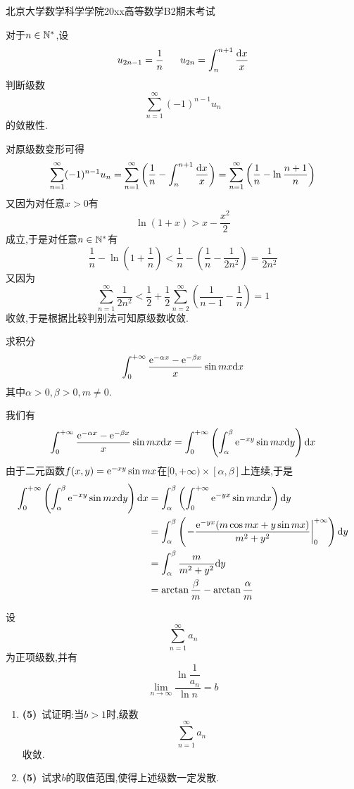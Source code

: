 \documentclass{ctexart}
\begin{document}
\pagestyle{empty}
\begin{center}\Large
    北京大学数学科学学院20xx高等数学B2期末考试
\end{center}
\begin{problem}[1.(10\songti{分})]
    对于$n\in\mathbb{N}^*$,设
    \[u_{2n-1}=\dfrac1n\ \ \ \ \ u_{2n}=\int_n^{n+1}\dfrac{\di x}{x}\]
    判断级数
    \[\sum_{n=1}^{\infty}(-1)^{n-1}u_n\]
    的敛散性.

\end{problem}
\begin{solution}
    对原级数变形可得
    \[\sum_{n=1}^{\infty}(-1)^{n-1}u_n
    =\sum_{n=1}^{\infty}\left(\dfrac1n-\int_n^{n+1}\dfrac{\mathrm{d} x}{x}\right)
    =\sum_{n=1}^{\infty}\left(\dfrac{1}{n}-\ln\dfrac{n+1}{n}\right)\]
    又因为对任意$x>0$有
    \[\ln(1+x)>x-\dfrac{x^2}{2}\]
    成立,于是对任意$n\in\mathbb{N}^*$有
    \[\dfrac{1}{n}-\ln\left(1+\dfrac1n\right)<\dfrac1n-\left(\dfrac1n-\dfrac{1}{2n^2}\right)=\dfrac{1}{2n^2}\]
    又因为
    \[\sum_{n=1}^{\infty}\dfrac{1}{2n^2}<\dfrac12+\dfrac12\sum_{n=2}^{\infty}\left(\dfrac{1}{n-1}-\dfrac1n\right)=1\]
    收敛,于是根据比较判别法可知原级数收敛.
\end{solution}
\begin{problem}[2.(10\songti{分})]
    求积分
    \[\int_0^{+\infty}\dfrac{\mathrm{e}^{-\alpha x}-\mathrm{e}^{-\beta x}}{x}\sin mx\mathrm{d} x\]
    其中$\alpha>0,\beta>0,m\neq0$.

\end{problem}
\begin{solution}
    我们有
    \[\int_0^{+\infty}\dfrac{\mathrm{e}^{-\alpha x}-\mathrm{e}^{-\beta x}}{x}\sin mx\mathrm{d} x
    =\int_0^{+\infty}\left(\int_{\alpha}^{\beta}\mathrm{e}^{-xy}\sin mx\mathrm{d} y\right)\mathrm{d} x\]
    由于二元函数$f(x,y)=\mathrm{e}^{-xy}\sin mx$在$[0,+\infty)\times[\alpha,\beta]$上连续,于是
    \[\begin{aligned}
        \int_0^{+\infty}\left(\int_{\alpha}^{\beta}\mathrm{e}^{-xy}\sin mx\mathrm{d} y\right)\mathrm{d} x
        &= \int_{\alpha}^{\beta}\left(\int_0^{+\infty}\mathrm{e}^{-yx}\sin mx\mathrm{d} x\right)\mathrm{d} y \\
        &= \int_{\alpha}^{\beta}\left(\left.-\dfrac{\mathrm{e}^{-yx}(m\cos mx+y\sin mx)}{m^2+y^2}\right|_0^{+\infty}\right)\mathrm{d} y \\
        &= \int_{\alpha}^{\beta}\dfrac{m}{m^2+y^2}\mathrm{d} y \\
        &= \arctan\dfrac{\beta}{m}-\arctan\dfrac{\alpha}{m}
    \end{aligned}\]

\end{solution}
\begin{problem}[3.(10\songti{分})]
    设
    \[\sum_{n=1}^{\infty}a_n\]
    为正项级数,并有
    \[\lim_{n\to\infty}\dfrac{\ln\dfrac{1}{a_n}}{\ln n}=b\]
    \begin{enumerate}[label=\tbf{(\arabic*)},topsep=0pt,parsep=0pt,itemsep=0pt,partopsep=0pt]
        \item \textbf{(5)}\ 试证明:当$b>1$时,级数
            \[\sum_{n=1}^{\infty}a_n\]
            收敛.
        \item \textbf{(5)}\ 试求$b$的取值范围,使得上述级数一定发散.
    \end{enumerate}
\end{problem}
\end{document}
